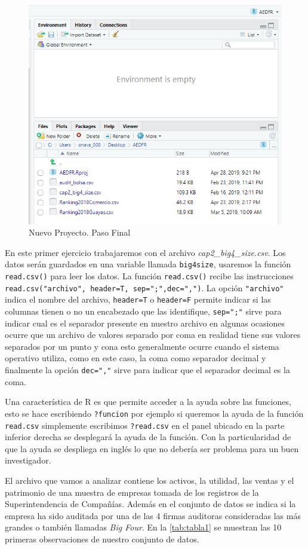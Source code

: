 \documentclass[]{book}
\begin{document}
\begin{figure}[h!]

{\centering \includegraphics[width=0.5\linewidth]{project4} 

}

\caption{Nuevo Proyecto. Paso Final}\label{fig:project4}
\end{figure}

En este primer ejercicio trabajaremos con el archivo \emph{cap2\_big4\_size.csv}. Los datos serán guardados en una variable llamada \texttt{big4size}, usaremos la función \texttt{read.csv()} para leer los datos. La función \texttt{read.csv()} recibe las instrucciones \texttt{read.csv("archivo",\ header=T,\ sep=";",dec=",")}. La opción \texttt{"archivo"} indica el nombre del archivo, \texttt{header=T} o \texttt{header=F} permite indicar si las columnas tienen o no un encabezado que las identifique, \texttt{sep=";"} sirve para indicar cual es el separador presente en nuestro archivo en algunas ocasiones ocurre que un archivo de valores separado por coma en realidad tiene sus valores separados por un punto y cona esto generalmente ocurre cuando el sistema operativo utiliza, como en este caso, la coma como separador decimal y finalmente la opción \texttt{dec=","} sirve para indicar que el separador decimal es la coma.

Una característica de R es que permite acceder a la ayuda sobre las funciones, esto se hace escribiendo \texttt{?funcion} por ejemplo si queremos la ayuda de la función \texttt{read.csv} simplemente escribimos \texttt{?read.csv} en el panel ubicado en la parte inferior derecha se desplegará la ayuda de la función. Con la particularidad de que la ayuda se despliega en inglés lo que no debería ser problema para un buen investigador.

El archivo que vamos a analizar contiene los activos, la utilidad, las ventas y el patrimonio de una muestra de empresas tomada de los registros de la Superintendencia de Compañías. Además en el conjunto de datos se indica si la empresa ha sido auditada por una de las 4 firmas auditoras consideradas las más grandes o también llamadas \emph{\emph{Big Four}}. En la \ref{tab:tabla1} se muestran las 10 primeras observaciones de nuestro conjunto de datos.
\end{document}
